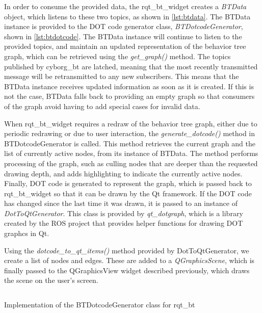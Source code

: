 \documentclass[\rootfolder/main.tex]{subfiles}
\begin{document}
In order to consume the provided data, the rqt\_bt\_widget creates a \emph{BTData} object, which listens to these two topics, as shown in \cref{lst:btdata}.
The BTData instance is provided to the DOT code generator class, \emph{BTDotcodeGenerator}, shown in \cref{lst:btdotcode}.
The BTData instance will continue to listen to the provided topics, and maintain an updated representation of the behavior tree graph, which can be retrieved using the \emph{get\_graph()} method.
The topics published by cyborg\_bt are latched, meaning that the most recently transmitted message will be retransmitted to any new subscribers.
This means that the BTData instance receives updated information as soon as it is created.
If this is not the case, BTData falls back to providing an empty graph so that consumers of the graph avoid having to add special cases for invalid data.

When rqt\_bt\_widget requires a redraw of the behavior tree graph, either due to periodic redrawing or due to user interaction, the \emph{generate\_dotcode()} method in BTDotcodeGenerator is called.
This method retrieves the current graph and the list of currently active nodes, from its instance of BTData.
The method performs processing of the graph, such as culling nodes that are deeper than the requested drawing depth, and adds highlighting to indicate the currently active nodes.
Finally, DOT code is generated to represent the graph, which is passed back to rqt\_bt\_widget so that it can be drawn by the Qt framework.
If the DOT code has changed since the last time it was drawn, it is passed to an instance of \emph{DotToQtGenerator}.
This class is provided by \emph{qt\_dotgraph}, which is a library created by the ROS project that provides helper functions for drawing DOT graphcs in Qt.

Using the \emph{dotcode\_to\_qt\_items()} method provided by DotToQtGenerator, we create a list of nodes and edges.
These are added to a \emph{QGraphicsScene}, which is finally passed to the QGraphicsView widget described previously, which draws the scene on the user's screen.

\begin{listing}
    \inputminted{Python}{\rootfolder/Chapters/Chapter4/Listings/dotcode.py}
    \caption{Implementation of the BTDotcodeGenerator class for rqt\_bt}
    \label{lst:btdotcode}
\end{listing}
\end{document}
